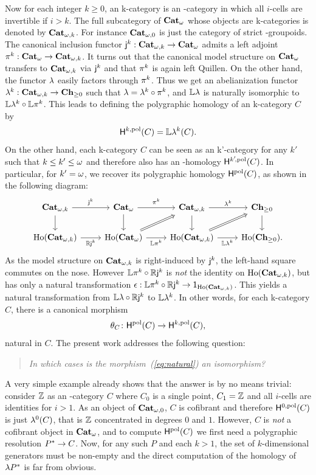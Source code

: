 Now for each integer $k\geq 0$, an \ook k-category is an \oo-category
in which all $i$-cells are invertible if  $i>k$. The full
subcategory of $\mathbf{Cat}_{\omega}$ whose objects are \ook k-categories is denoted
by $\mathbf{Cat}_{\omega,k}$. For instance $\mathbf{Cat}_{\omega,0}$ is just the category of strict
\oo-groupoids.
The canonical inclusion functor $\mathsf{j}_{}^{k}:\mathbf{Cat}_{\omega,k}\to\mathbf{Cat}_{\omega}$ admits a left
adjoint $\mathsf{\pi}_{}^{k}:\mathbf{Cat}_{\omega}\to\mathbf{Cat}_{\omega,k}$. It turns out that the canonical model 
structure on $\mathbf{Cat}_{\omega}$ transfers to $\mathbf{Cat}_{\omega,k}$ via $\mathsf{j}_{}^{k}$ and that
$\mathsf{\pi}_{}^{k}$ is again left Quillen. On the other hand, the functor
$\mathsf{\lambda}$ easily factors through $\mathsf{\pi}_{}^{k}$. Thus we get an
abelianization functor $\mathsf{\mathsf{\lambda}}^{k}:\mathbf{Cat}_{\omega,k}\to\mathbf{Ch}_{\geq 0}$ such that
$\mathsf{\lambda}=\mathsf{\mathsf{\lambda}}^{k}\circ\mathsf{\pi}_{}^{k}$, and $\mathbb{L}\mathsf{\lambda}$ is naturally isomorphic
to $\mathbb{L}\mathsf{\mathsf{\lambda}}^{k}\circ \mathbb{L}\mathsf{\pi}_{}^{k}$. This leads to defining the
polygraphic homology of an \ook k-category $C$ by
\[\mathsf{H}^{k,\mathrm{pol}}(C)=\mathbb{L}\mathsf{\mathsf{\lambda}}^{k}(C).\]
On the other hand, each \ook k-category $C$ can be seen as an \ook
{k'}-category for any $k'$ such that $k\leq k'\leq \omega$ and therefore also has an -homology $\mathsf{H}^{k'\!,\mathrm{pol}}(C)$. In particular, for
$k'=\omega$, we recover its polygraphic homology $\mathsf{H}^{\mathrm{pol}}(C)$, as shown in 
the following diagram:
\[
  \begin{tikzcd}
    \opCat k \ar[r,"\oemb k"]\ar[d]& \oCat\ar[r,"\opifun k"]\ar[d] & \opCat k\ar[r,"\abelk k"]\ar[d] & \Chp\ar[d]\\
  \Loc{\opCat k}\ar[r,"\RR\oemb k"']& \Loc{\oCat}\ar[r,"\LL\opifun k"']\ar[ru,Rightarrow] & \Loc{\opCat
  k}\ar[r,"\LL\abelk k"']\ar[ru,Rightarrow]& \Loc{\Chp}.
  \end{tikzcd}
  \]
As the model structure on $\mathbf{Cat}_{\omega,k}$ is right-induced by $\mathsf{j}_{}^{k}$,
the left-hand square commutes on the nose. However $\mathbb{L}\mathsf{\pi}_{}^{k}\circ
\mathbb{R}\mathsf{j}_{}^{k}$ is {\em not} the identity on $\mathrm{Ho}(\mathbf{Cat}_{\omega,k})$, but has
only a natural transformation $\epsilon:\mathbb{L}\mathsf{\pi}_{}^{k}\circ
\mathbb{R}\mathsf{j}_{}^{k}\to \mathsf{1}_{\mathrm{Ho}(\mathbf{Cat}_{\omega,k})}$. This yields a natural
transformation from $\mathbb{L}\mathsf{\lambda}\circ\mathbb{R}\mathsf{j}_{}^{k}$ to $\mathbb{L}\mathsf{\mathsf{\lambda}}^{k}$. In
other words, for each \ook k-category $C$, there is a canonical morphism
\begin{equation}
  \label{eq:natural}
  \theta_{C}\colon\mathsf{H}^{\mathrm{pol}}(C)\to \mathsf{H}^{k,\mathrm{pol}} (C),
\end{equation}
natural in $C$.
The present work addresses the following question:
\begin{quote}
 {\em In which cases is the morphism~(\ref{eq:natural}) an isomorphism?}
\end{quote}
 A very simple example
already shows that the answer is by no means trivial: consider $\mathbb Z$ as an
-category $C$ where $C_0$ is a single point, $C_1=\mathbb Z$ and all
$i$-cells are identities for $i>1$. As an object of $\mathbf{Cat}_{\omega,0}$, $C$ is
cofibrant and therefore $\mathsf{H}^{0,\mathrm{pol}}(C)$ is just $\mathsf{\mathsf{\lambda}}^{0}(C)$, that is
$\mathbb Z$ concentrated in degrees $0$ and $1$. However,
$C$ is {\em not} a cofibrant object in $\mathbf{Cat}_{\omega}$, and to compute
$\mathsf{H}^{\mathrm{pol}}(C)$ we first need a polygraphic resolution $P^*\to C$. Now, for any such $P$ and each $k>1$, the set of $k$-dimensional
generators must be non-empty and the direct computation of the homology of
$\mathsf{\lambda}P^*$ is far from obvious.

